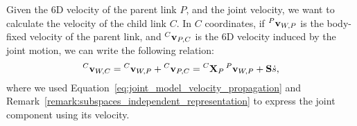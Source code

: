 \begin{definition*}
%
Given the 6D velocity of the parent link $P$, and the joint velocity, we want to calculate the velocity of the child link $C$.
In $C$ coordinates, if $\velsix[P]_{W,P}$ is the body-fixed velocity of the parent link, and $\velsix[C]_{P,C}$ is the 6D velocity induced by the joint motion, we can write the following relation:
%
\begin{equation*}
    \velsix[C]_{W,C}
    = \velsix[C]_{W,P} + \velsix[C]_{P,C}
    = \transvel[C]_P \velsix[P]_{W,P} + \subspace \dot{\shape}
    ,
\end{equation*}
%
where we used Equation~\eqref{eq:joint_model_velocity_propagation} and Remark~\ref{remark:subspaces_independent_representation} to express the joint component using its velocity.
%
\end{definition*}

